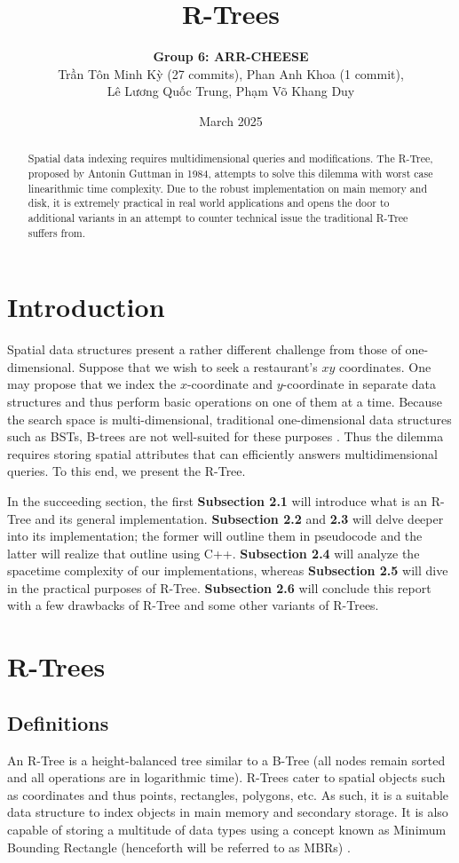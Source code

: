 \documentclass{article}
\title{R-Trees}
\author{\textbf{Group 6: ARR-CHEESE}\\\foreignlanguage{vietnamese}{Trần Tôn Minh Kỳ (27 commits), Phan Anh Khoa (1 commit),}\\\foreignlanguage{vietnamese}{Lê Lương Quốc Trung, Phạm Võ Khang Duy}}
\date{March 2025}
\begin{document}
\maketitle

\begin{abstract}
    Spatial data indexing requires multidimensional queries and modifications. The R-Tree, proposed by Antonin Guttman in 1984, attempts to solve this dilemma with worst case linearithmic time complexity. Due to the robust implementation on main memory and disk, it is extremely practical in real world applications and opens the door to additional variants in an attempt to counter technical issue the traditional R-Tree suffers from.
\end{abstract}

\tableofcontents

\newpage
\section{Introduction}
Spatial data structures present a rather different challenge from those of one-dimensional. Suppose that we wish to seek a restaurant's $xy$ coordinates. One may propose that we index the $x$-coordinate and $y$-coordinate in separate data structures and thus perform basic operations on one of them at a time. Because the search space is multi-dimensional, traditional one-dimensional data structures such as BSTs, B-trees are not well-suited for these purposes \cite{Guttman1984}. Thus the dilemma requires storing spatial attributes that can efficiently answers multidimensional queries. To this end, we present the R-Tree.

In the succeeding section, the first \textbf{Subsection 2.1} will introduce what is an R-Tree and its general implementation. \textbf{Subsection 2.2} and \textbf{2.3} will delve deeper into its implementation; the former will outline them in pseudocode and the latter will realize that outline using C++. \textbf{Subsection 2.4} will analyze the spacetime complexity of our implementations, whereas \textbf{Subsection 2.5} will dive in the practical purposes of R-Tree. \textbf{Subsection 2.6} will conclude this report with a few drawbacks of R-Tree and some other variants of R-Trees.

\section{R-Trees}
\subsection{Definitions}
An R-Tree is a height-balanced tree similar to a B-Tree \cite{Guttman1984} (all nodes remain sorted and all operations are in logarithmic time). R-Trees cater to spatial objects such as coordinates and thus points, rectangles, polygons, etc. As such, it is a suitable data structure to index objects in main memory and secondary storage. It is also capable of storing a multitude of data types using a concept known as Minimum Bounding Rectangle (henceforth will be referred to as MBRs) \cite{Papadopoulos2018}.
\end{document}

